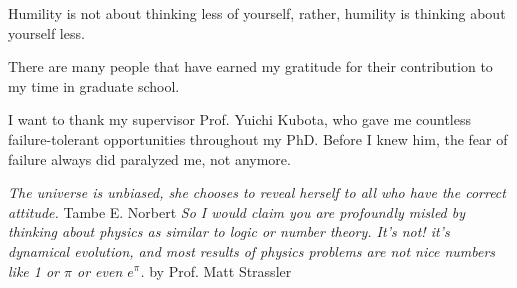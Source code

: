 Humility is not about thinking less of yourself, rather, humility is thinking about yourself less.


There are many people that have earned my gratitude for their contribution to my
time in graduate school. 

I want to thank my supervisor Prof. Yuichi Kubota, who gave me countless failure-tolerant opportunities
throughout my PhD. Before I knew him, the fear of failure always did paralyzed me, not anymore.

\textit{The universe is unbiased, she chooses to reveal herself to all who have the correct attitude.}
\newline
\textsf{Tambe E. Norbert}
\newline
\textit{So I would claim you are profoundly misled by thinking about physics as similar to logic or number theory. It’s not! it’s dynamical evolution, and most results of physics problems are not nice numbers like 1 or $\pi$ or even $e^{\pi}$.}
\newline
\textsf{by Prof. Matt Strassler}

